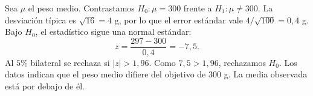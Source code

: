 Sea $\mu$ el peso medio. Contrastamos $H_0:\mu=300$ frente a $H_1:\mu\ne300$. La desviación típica es $\sqrt{16}=4$ g, por lo que el error estándar vale $4/\sqrt{100}=0{,}4$ g. Bajo $H_0$, el estadístico sigue una normal estándar:
\[
z=\frac{297-300}{0{,}4}=-7{,}5.
\]
Al $5\%$ bilateral se rechaza si $|z|>1{,}96$. Como $7{,}5>1{,}96$, rechazamos $H_0$. Los datos indican que el peso medio difiere del objetivo de $300$ g. La media observada está por debajo de él.

